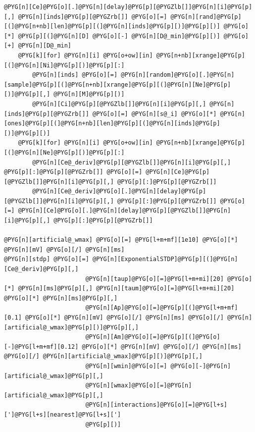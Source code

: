\documentclass[letterpaper,10pt,english]{manual}
\begin{document}
\begin{Verbatim}[commandchars=@\[\]]
        @PYG[n][Ce]@PYG[o][.]@PYG[n][delay]@PYG[p][@PYGZlb[]]@PYG[n][i]@PYG[p][,] @PYG[n][inds]@PYG[p][@PYGZrb[]] @PYG[o][=] @PYG[n][rand]@PYG[p][(]@PYG[n+nb][len]@PYG[p][(]@PYG[n][inds]@PYG[p][)]@PYG[p][)] @PYG[o][*] @PYG[p][(]@PYG[n][D] @PYG[o][-] @PYG[n][D@_min]@PYG[p][)] @PYG[o][+] @PYG[n][D@_min]
    @PYG[k][for] @PYG[n][i] @PYG[o+ow][in] @PYG[n+nb][xrange]@PYG[p][(]@PYG[n][Ni]@PYG[p][)]@PYG[p][:]
        @PYG[n][inds] @PYG[o][=] @PYG[n][random]@PYG[o][.]@PYG[n][sample]@PYG[p][(]@PYG[n+nb][xrange]@PYG[p][(]@PYG[n][Ne]@PYG[p][)]@PYG[p][,] @PYG[n][M]@PYG[p][)]
        @PYG[n][Ci]@PYG[p][@PYGZlb[]]@PYG[n][i]@PYG[p][,] @PYG[n][inds]@PYG[p][@PYGZrb[]] @PYG[o][=] @PYG[n][s@_i] @PYG[o][*] @PYG[n][ones]@PYG[p][(]@PYG[n+nb][len]@PYG[p][(]@PYG[n][inds]@PYG[p][)]@PYG[p][)]
    @PYG[k][for] @PYG[n][i] @PYG[o+ow][in] @PYG[n+nb][xrange]@PYG[p][(]@PYG[n][Ne]@PYG[p][)]@PYG[p][:]
        @PYG[n][Ce@_deriv]@PYG[p][@PYGZlb[]]@PYG[n][i]@PYG[p][,] @PYG[p][:]@PYG[p][@PYGZrb[]] @PYG[o][=] @PYG[n][Ce]@PYG[p][@PYGZlb[]]@PYG[n][i]@PYG[p][,] @PYG[p][:]@PYG[p][@PYGZrb[]]
        @PYG[n][Ce@_deriv]@PYG[o][.]@PYG[n][delay]@PYG[p][@PYGZlb[]]@PYG[n][i]@PYG[p][,] @PYG[p][:]@PYG[p][@PYGZrb[]] @PYG[o][=] @PYG[n][Ce]@PYG[o][.]@PYG[n][delay]@PYG[p][@PYGZlb[]]@PYG[n][i]@PYG[p][,] @PYG[p][:]@PYG[p][@PYGZrb[]]

@PYG[n][artificial@_wmax] @PYG[o][=] @PYG[l+m+mf][1e10] @PYG[o][*] @PYG[n][mV] @PYG[o][/] @PYG[n][ms]
@PYG[n][stdp] @PYG[o][=] @PYG[n][ExponentialSTDP]@PYG[p][(]@PYG[n][Ce@_deriv]@PYG[p][,]
                       @PYG[n][taup]@PYG[o][=]@PYG[l+m+mi][20] @PYG[o][*] @PYG[n][ms]@PYG[p][,] @PYG[n][taum]@PYG[o][=]@PYG[l+m+mi][20] @PYG[o][*] @PYG[n][ms]@PYG[p][,]
                       @PYG[n][Ap]@PYG[o][=]@PYG[p][(]@PYG[l+m+mf][0.1] @PYG[o][*] @PYG[n][mV] @PYG[o][/] @PYG[n][ms] @PYG[o][/] @PYG[n][artificial@_wmax]@PYG[p][)]@PYG[p][,]
                       @PYG[n][Am]@PYG[o][=]@PYG[p][(]@PYG[o][-]@PYG[l+m+mf][0.12] @PYG[o][*] @PYG[n][mV] @PYG[o][/] @PYG[n][ms] @PYG[o][/] @PYG[n][artificial@_wmax]@PYG[p][)]@PYG[p][,]
                       @PYG[n][wmin]@PYG[o][=] @PYG[o][-]@PYG[n][artificial@_wmax]@PYG[p][,]
                       @PYG[n][wmax]@PYG[o][=]@PYG[n][artificial@_wmax]@PYG[p][,]
                       @PYG[n][interactions]@PYG[o][=]@PYG[l+s][']@PYG[l+s][nearest]@PYG[l+s][']
                       @PYG[p][)]


\end{Verbatim}
\end{document}
